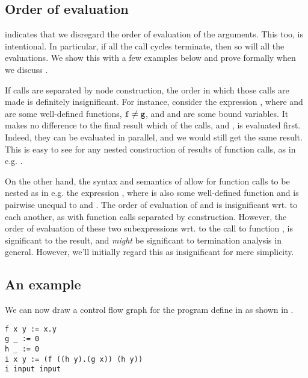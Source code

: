 \subsection{Order of evaluation}

 indicates that we disregard the
order of evaluation of the arguments. This too, is intentional.  In particular,
if all the call cycles terminate, then so will all the evaluations. We show
this with a few examples below and prove formally when we discuss
.

If calls are separated by node construction, the order in which those calls are
made is definitely insignificant. For instance, consider the expression
, where  and  are some well-defined
functions, $\text{{\ttfamily f}}\neq\text{{\ttfamily g}}$, and  and  are
some bound variables. It makes no difference to the final result which of the
calls,  and , is evaluated first. Indeed, they can be
evaluated in parallel, and we would still get the same result. This is easy to
see for any nested construction of results of function calls, as in e.g.
.

On the other hand, the syntax and semantics of \D{} allow for function calls to
be nested as in e.g. the expression , where  is
also some well-defined function and is pairwise unequal to  and
. The order of evaluation of  and  is
insignificant wrt. to each another, as with function calls separated by
construction. However, the order of evaluation of these two subexpressions wrt.
to the call to function , is significant to the result, and
\emph{might} be significant to termination analysis in general. However, we'll
initially regard this as insignificant for mere simplicity.

\subsection{An example}

We can now draw a control flow graph for the program define in
 as shown in .

\begin{lstlisting}[label=listing:cfg-sample-1,caption={A sample \D{} program, always returning \mono{0.0.0}.}]
f x y := x.y
g _ := 0
h _ := 0
i x y := (f ((h y).(g x)) (h y))
i input input
\end{lstlisting}

